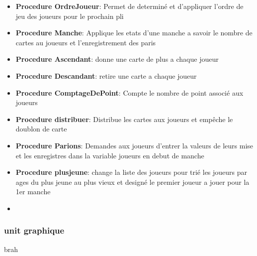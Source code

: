\documentclass[12pt]{report}
\begin{document}
\begin{itemize}
  \item \textbf{Procedure OrdreJoueur}: Permet de determiné et d'appliquer l'ordre de jeu des joueurs pour le prochain pli
  \item \textbf{Procedure Manche}: Applique les etats d'une manche a savoir le nombre de cartes au joueurs et l'enregistrement des paris 
  \item \textbf{Procedure Ascendant}: donne une carte de plus a chaque joueur
  \item \textbf{Procedure Descandant}: retire une carte a chaque joueur 
  \item \textbf{Procedure ComptageDePoint}: Compte le nombre de point associé aux joueurs 
  \item \textbf{Procedure distribuer}: Distribue les cartes aux joueurs et empêche le doublon de carte 
  \item \textbf{Procedure Parions}: Demandes aux joueurs d'entrer la valeurs de leurs mise et les enregistres dans la variable joueurs en debut de manche 
  \item \textbf{Procedure plusjeune}: change la liste des joueurs pour trié les joueurs par ages du plus jeune au plus vieux et designé le premier joueur a jouer pour la 1er manche 
  \item 
  \end{itemize}
  
  \subsubsection{unit graphique}
	
	brah  
  
\end{document}

